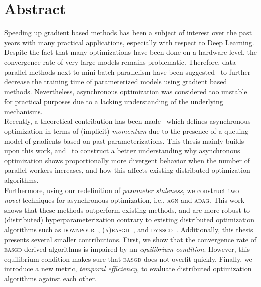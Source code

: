 %
%
%

\newpage
\chapter*{Abstract}

Speeding up gradient based methods has been a subject of interest over the past years with many practical applications, especially with respect to Deep Learning. Despite the fact that many optimizations have been done on a hardware level, the convergence rate of very large models remains problematic. Therefore, data parallel methods next to mini-batch parallelism have been suggested~\cite{dean2012large, ho2013more, hadjis2016omnivore, recht2011hogwild, louppe2010zealous, jiang2017heterogeneity, zhang2015deep} to further decrease the training time of parameterized models using gradient based methods. Nevertheless, asynchronous optimization was considered too unstable for practical purposes due to a lacking understanding of the underlying mechanisms.\\

Recently, a theoretical contribution has been made~\cite{implicitmomentum} which defines asynchronous optimization in terms of (implicit) \emph{momentum} due to the presence of a queuing model of gradients based on past parameterizations. This thesis mainly builds upon this work, and~\cite{zhang2015deep} to construct a better understanding why asynchronous optimization shows proportionally more divergent behavior when the number of parallel workers increases, and how this affects existing distributed optimization algorithms.\\

Furthermore, using our redefinition of \emph{parameter staleness}, we construct two \emph{novel} techniques for asynchronous optimization, i.e., \textsc{agn} and \textsc{adag}. This work shows that these methods outperform existing methods, and are more robust to (distributed) hyperparameterization contrary to existing distributed optimization algorithms such as \textsc{downpour}~\cite{dean2012large}, \textsc{(a)easgd}~\cite{zhang2015deep}, and \textsc{dynsgd}~\cite{jiang2017heterogeneity}. Additionally, this thesis presents several smaller contributions. First, we show that the convergence rate of \textsc{easgd} derived algorithms is impaired by an \emph{equilibrium condition}. However, this equilibrium condition makes sure that \textsc{easgd} does not overfit quickly. Finally, we introduce a new metric, \emph{temporal efficiency}, to evaluate distributed optimization algorithms against each other.

